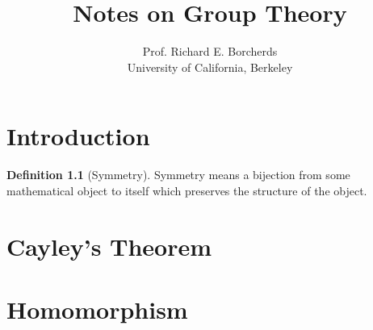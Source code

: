 \documentclass{report}
\theoremstyle{definition}\newtheorem{definition}{Definition}
\theoremstyle{remark}\newtheorem{remark}{Remark}
\theoremstyle{remark}\newtheorem{example}{Example}
\begin{document}
\title{Notes on Group Theory}
\author{Prof. Richard E. Borcherds \\ University of California, Berkeley}

\maketitle
\tableofcontents

\chapter{Introduction}
\begin{definition}[Symmetry]
Symmetry means a bijection from some mathematical object to itself which preserves the structure of the object.
\end{definition}
\chapter{Cayley's Theorem}
\chapter{Homomorphism}
\end{document}
